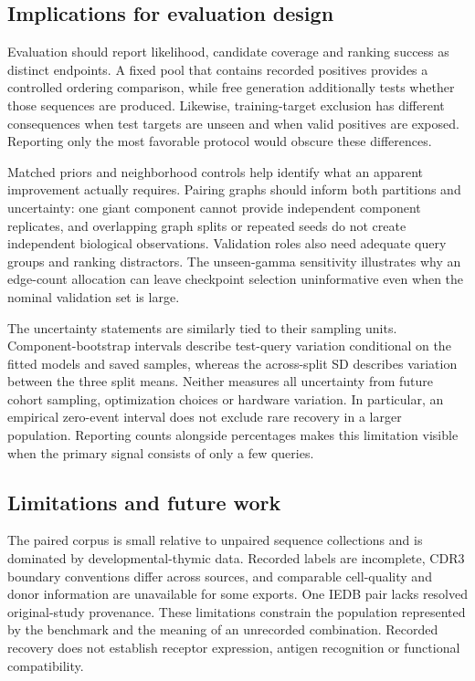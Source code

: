 \documentclass[a4paper,11pt]{article}
\begin{document}
\subsection{Implications for evaluation design}
Evaluation should report likelihood, candidate coverage and ranking success
as distinct endpoints. A fixed pool that contains recorded positives provides
a controlled ordering comparison, while free generation additionally tests
whether those sequences are produced. Likewise, training-target exclusion
has different consequences when test targets are unseen and when valid
positives are exposed. Reporting only the most favorable protocol would
obscure these differences.

Matched priors and neighborhood controls help identify what an apparent
improvement actually requires. Pairing graphs should inform both partitions
and uncertainty: one giant component cannot provide independent component
replicates, and overlapping graph splits or repeated seeds do not create
independent biological observations. Validation roles also need adequate
query groups and ranking distractors. The unseen-gamma sensitivity illustrates
why an edge-count allocation can leave checkpoint selection uninformative
even when the nominal validation set is large.

The uncertainty statements are similarly tied to their sampling units.
Component-bootstrap intervals describe test-query variation conditional on
the fitted models and saved samples, whereas the across-split SD describes
variation between the three split means. Neither measures all uncertainty
from future cohort sampling, optimization choices or hardware variation.
In particular, an empirical zero-event interval does not exclude rare recovery
in a larger population. Reporting counts alongside percentages makes this
limitation visible when the primary signal consists of only a few queries.

\subsection{Limitations and future work}
The paired corpus is small relative to unpaired sequence collections and is
dominated by developmental-thymic data. Recorded labels are incomplete, CDR3
boundary conventions differ across sources, and comparable cell-quality and
donor information are unavailable for some exports. One IEDB pair lacks
resolved original-study provenance. These limitations constrain the
population represented by the benchmark and the meaning of an unrecorded
combination. Recorded recovery does not establish receptor expression,
antigen recognition or functional compatibility.
\end{document}
